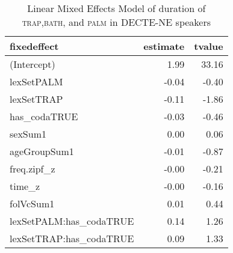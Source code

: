 \begin{table}[ht]
\centering
\begin{tabular}{lrr}
  \hline
fixedeffect & estimate & tvalue \\ 
  \hline
(Intercept) & 1.99 & 33.16 \\ 
  lexSetPALM & -0.04 & -0.40 \\ 
  lexSetTRAP & -0.11 & -1.86 \\ 
  has\_codaTRUE & -0.03 & -0.46 \\ 
  sexSum1 & 0.00 & 0.06 \\ 
  ageGroupSum1 & -0.01 & -0.87 \\ 
  freq.zipf\_z & -0.00 & -0.21 \\ 
  time\_z & -0.00 & -0.16 \\ 
  folVcSum1 & 0.01 & 0.44 \\ 
  lexSetPALM:has\_codaTRUE & 0.14 & 1.26 \\ 
  lexSetTRAP:has\_codaTRUE & 0.09 & 1.33 \\ 
   \hline
\end{tabular}
\caption{Linear Mixed Effects Model of duration of \textsc{trap},\textsc{bath}, and \textsc{palm} in DECTE-NE speakers \label{tbl:TBPdurDE}} 
\end{table}
